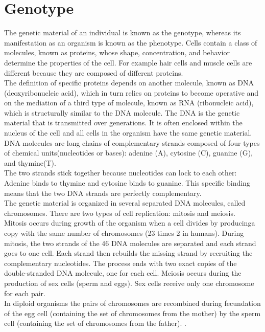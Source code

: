     \section{Genotype}
      The genetic material of an individual is known as the genotype, whereas its manifestation as an organism is known as the phenotype. Cells contain a class of molecules, known as proteins, whose shape,
      concentration, and behavior determine the properties of the cell. For example hair cells and muscle cells are different because they are composed of different proteins. \\
      The definition of specific proteins depends on another molecule, known as DNA (deoxyribonucleic acid), which in turn relies on proteins to become operative and on the mediation of a third type of molecule,
      known as RNA (ribonucleic acid), which is structurally similar to the DNA molecule. The DNA is the genetic material that is transmitted over generations.
      It is often enclosed within the nucleus of the cell and all cells in the organism have the same genetic material. \\
      DNA molecules are long chains of complementary strands composed of four types of chemical units(nucleotides or bases): adenine (A), cytosine (C), guanine (G), and thymine(T). \\
      The two strands stick together because nucleotides can lock to each other: Adenine binds to thymine and cytosine binds to guanine. This specific binding means that the two DNA strands are perfectly complementary. \\
      The genetic material is organized in several separated DNA molecules, called chromosomes. There are two types of cell replication: mitosis and meiosis. \\
      Mitosis occurs during growth of the organism when a cell divides by producinga copy with the same number of chromosomes (23 times 2 in humans).
      During mitosis, the two strands of the 46 DNA molecules are separated and each strand goes to one cell. Each strand then rebuilds the missing strand by recruiting the complementary nucleotides.
      The process ends with two exact copies of the double-stranded DNA molecule, one for each cell.
      Meiosis occurs during the production of sex cells (sperm and eggs). Sex cells receive only one chromosome for each pair. \\
      In diploid organisms the pairs of chromosomes are recombined during fecundation of the egg cell (containing the set of chromosomes from the mother) by the sperm cell (containing the set of chromosomes from the father).
      \cite[S.5 - 7]{book:bioInspired}.

